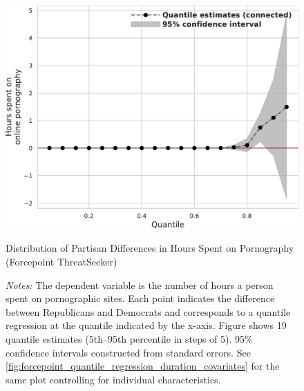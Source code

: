 \documentclass[12pt,twoside]{article}
\begin{document}
\begin{figure}[t]
	\centering
	\includegraphics[width=.6\linewidth]{figs/forcepoint_quantile_reg_duration_adult.pdf}
	\caption{Distribution of Partisan Differences in Hours Spent on Pornography (Forcepoint ThreatSeeker)}
	\caption*{\footnotesize \emph{Notes:} 
		The dependent variable is the number of hours a person spent on pornographic sites.
		Each point indicates the difference between Republicans and Democrats and corresponds to a quantile regression at the quantile indicated by the x-axis.
  Figure shows 19 quantile estimates (5th--95th percentile in steps of 5).
		95\% confidence intervals constructed from standard errors.
		See \cref{fig:forcepoint_quantile_regression_duration_covariates} for the same plot controlling for individual characteristics.
	}
	\label{fig:forcepoint_quantile_regression_duration}
\end{figure}
\end{document}

